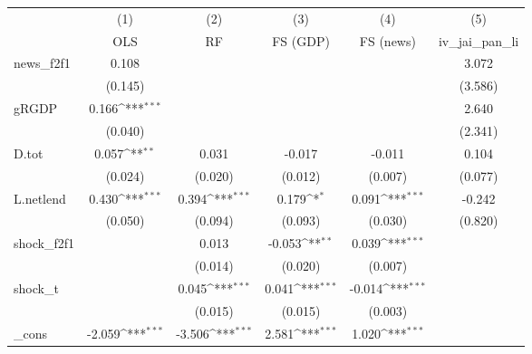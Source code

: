 {
\def\sym#1{\ifmmode^{#1}\else\(^{#1}\)\fi}
\begin{tabular}{l*{5}{c}}
\toprule
            &\multicolumn{1}{c}{(1)}&\multicolumn{1}{c}{(2)}&\multicolumn{1}{c}{(3)}&\multicolumn{1}{c}{(4)}&\multicolumn{1}{c}{(5)}\\
            &\multicolumn{1}{c}{OLS}&\multicolumn{1}{c}{RF}&\multicolumn{1}{c}{FS (GDP)}&\multicolumn{1}{c}{FS (news)}&\multicolumn{1}{c}{iv\_jai\_pan\_li}\\
\midrule
news\_f2f1   &       0.108         &                     &                     &                     &       3.072         \\
            &     (0.145)         &                     &                     &                     &     (3.586)         \\
\addlinespace
gRGDP       &       0.166\sym{***}&                     &                     &                     &       2.640         \\
            &     (0.040)         &                     &                     &                     &     (2.341)         \\
\addlinespace
D.tot       &       0.057\sym{**} &       0.031         &      -0.017         &      -0.011         &       0.104         \\
            &     (0.024)         &     (0.020)         &     (0.012)         &     (0.007)         &     (0.077)         \\
\addlinespace
L.netlend   &       0.430\sym{***}&       0.394\sym{***}&       0.179\sym{*}  &       0.091\sym{***}&      -0.242         \\
            &     (0.050)         &     (0.094)         &     (0.093)         &     (0.030)         &     (0.820)         \\
\addlinespace
shock\_f2f1  &                     &       0.013         &      -0.053\sym{**} &       0.039\sym{***}&                     \\
            &                     &     (0.014)         &     (0.020)         &     (0.007)         &                     \\
\addlinespace
shock\_t     &                     &       0.045\sym{***}&       0.041\sym{***}&      -0.014\sym{***}&                     \\
            &                     &     (0.015)         &     (0.015)         &     (0.003)         &                     \\
\addlinespace
\_cons      &      -2.059\sym{***}&      -3.506\sym{***}&       2.581\sym{***}&       1.020\sym{***}&                     \\

\end{tabular}}
